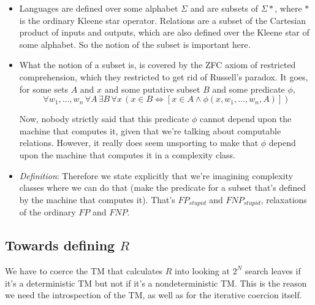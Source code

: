 \documentclass{article}
\begin{document}
\begin{itemize}
    \item Languages are defined over some alphabet $\Sigma$ and are subsets of $\Sigma*$, where $*$ is the ordinary Kleene star operator. Relations are a subset of the Cartesian product of inputs and outputs, which are also defined over the Kleene star of some alphabet. So the notion of the subset is important here.
    \item What the notion of a subset is, is covered by the ZFC axiom of restricted comprehension, which they restricted to get rid of Russell's paradox. It goes, for some sets $A$ and $x$ and some putative subset $B$ and some predicate $\phi$, $$\forall w_1,\ldots,w_n \, \forall A \, \exists B \, \forall x \, ( x \in B \Leftrightarrow [ x \in A \land \phi(x, w_1, \ldots, w_n , A) ] )$$
    
    Now, nobody strictly said that this predicate $\phi$ cannot depend upon the machine that computes it, given that we're talking about computable relations. However, it really does seem unsporting to make that $\phi$ depend upon the machine that computes it in a complexity class.
    \item \textit{Definition}: Therefore we state explicitly that we're imagining complexity classes where we can do that (make the predicate for a subset that's defined by the machine that computes it). That's $FP_{stupid}$ and $FNP_{stupid}$, relaxations of the ordinary $FP$ and $FNP$.
\end{itemize}

\subsection{Towards defining $R$}

We have to coerce the TM that calculates $R$ into looking at $2^N$ search leaves if it's a deterministic TM but not if it's a nondeterministic TM. This is the reason we need the introspection of the TM, as well as for the iterative coercion itself.
\end{document}

